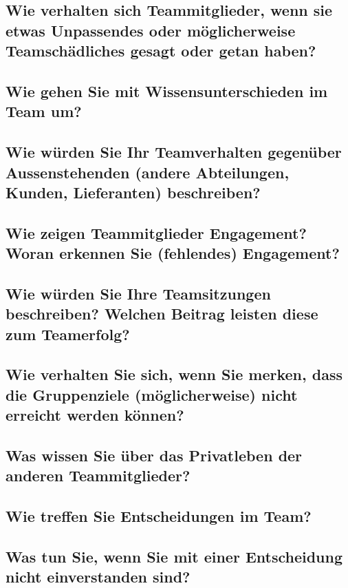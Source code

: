 \subsection*{Wie verhalten sich Teammitglieder, wenn sie etwas Unpassendes oder möglicherweise Teamschädliches gesagt oder getan haben?}

\subsection*{Wie gehen Sie mit Wissensunterschieden im Team um?}

\subsection*{Wie würden Sie Ihr Teamverhalten gegenüber Aussenstehenden (andere Abteilungen,
Kunden, Lieferanten) beschreiben?}

\subsection*{Wie zeigen Teammitglieder Engagement? Woran erkennen Sie (fehlendes)
Engagement?}

\subsection*{Wie würden Sie Ihre Teamsitzungen beschreiben? Welchen Beitrag leisten diese zum
Teamerfolg?}

\subsection*{Wie verhalten Sie sich, wenn Sie merken, dass die Gruppenziele (möglicherweise)
nicht erreicht werden können?}

\subsection*{Was wissen Sie über das Privatleben der anderen Teammitglieder?}

\subsection*{Wie treffen Sie Entscheidungen im Team?}

\subsection*{Was tun Sie, wenn Sie mit einer Entscheidung nicht einverstanden sind?}

